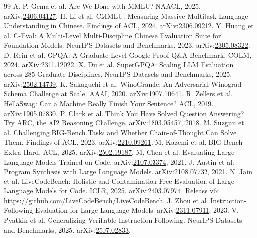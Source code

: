 \begin{thebibliography}{99}
 A. P. Gema et al. Are We Done with MMLU? NAACL, 2025. arXiv:\href{https://arxiv.org/abs/2406.04127}{2406.04127}.
 H. Li et al. CMMLU: Measuring Massive Multitask Language Understanding in Chinese. Findings of ACL, 2024. arXiv:\href{https://arxiv.org/abs/2306.09212}{2306.09212}.
 Y. Huang et al. C-Eval: A Multi-Level Multi-Discipline Chinese Evaluation Suite for Foundation Models. NeurIPS Datasets and Benchmarks, 2023. arXiv:\href{https://arxiv.org/abs/2305.08322}{2305.08322}.
 D. Rein et al. GPQA: A Graduate-Level Google-Proof Q\&A Benchmark. COLM, 2024. arXiv:\href{https://arxiv.org/abs/2311.12022}{2311.12022}.
 X. Du et al. SuperGPQA: Scaling LLM Evaluation across 285 Graduate Disciplines. NeurIPS Datasets and Benchmarks, 2025. arXiv:\href{https://arxiv.org/abs/2502.14739}{2502.14739}.
 K. Sakaguchi et al. WinoGrande: An Adversarial Winograd Schema Challenge at Scale. AAAI, 2020. arXiv:\href{https://arxiv.org/abs/1907.10641}{1907.10641}.
 R. Zellers et al. HellaSwag: Can a Machine Really Finish Your Sentence? ACL, 2019. arXiv:\href{https://arxiv.org/abs/1905.07830}{1905.07830}.
 P. Clark et al. Think You Have Solved Question Answering? Try ARC, the AI2 Reasoning Challenge. arXiv:\href{https://arxiv.org/abs/1803.05457}{1803.05457}, 2018.
 M. Suzgun et al. Challenging BIG-Bench Tasks and Whether Chain-of-Thought Can Solve Them. Findings of ACL, 2023. arXiv:\href{https://arxiv.org/abs/2210.09261}{2210.09261}.
 M. Kazemi et al. BIG-Bench Extra Hard. ACL, 2025. arXiv:\href{https://arxiv.org/abs/2502.19187}{2502.19187}.
 M. Chen et al. Evaluating Large Language Models Trained on Code. arXiv:\href{https://arxiv.org/abs/2107.03374}{2107.03374}, 2021.
 J. Austin et al. Program Synthesis with Large Language Models. arXiv:\href{https://arxiv.org/abs/2108.07732}{2108.07732}, 2021.
 N. Jain et al. LiveCodeBench: Holistic and Contamination Free Evaluation of Large Language Models for Code. ICLR, 2025. arXiv:\href{https://arxiv.org/abs/2403.07974}{2403.07974}. Release v6: \url{https://github.com/LiveCodeBench/LiveCodeBench}.
 J. Zhou et al. Instruction-Following Evaluation for Large Language Models. arXiv:\href{https://arxiv.org/abs/2311.07911}{2311.07911}, 2023.
 V. Pyatkin et al. Generalizing Verifiable Instruction Following. NeurIPS Datasets and Benchmarks, 2025. arXiv:\href{https://arxiv.org/abs/2507.02833}{2507.02833}.

\end{thebibliography}
